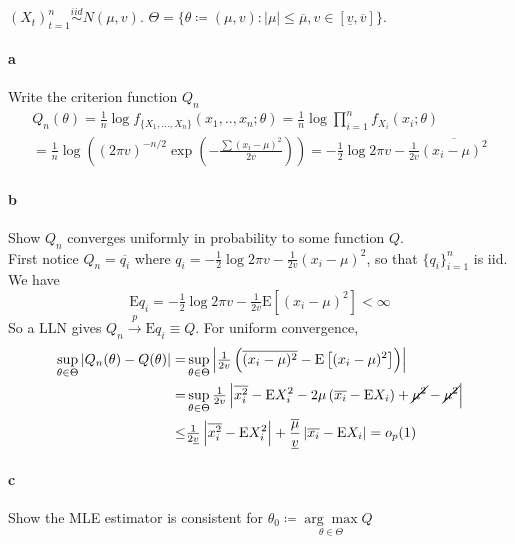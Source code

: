 \documentclass[11pt,letterpaper]{article}                  %
\begin{document}
\bigskip
\begin{problem}
$(X_t)_{t=1}^{n} \overset{iid}{\sim} N(\mu, v) $. $\Theta = \{ \theta
\coloneqq (\mu,
v): |\mu| \le \overline{\mu}, v \in [\underline{v}, \overline{v}]\}$.
\paragraph*{a} Write the criterion function $Q_n$
\begin{multline*}
  Q_n(\theta) = \tfrac{1}{n}\log f_{\{X_1,...,X_n\}}(x_1,..,x_n;\theta) =
  \tfrac{1}{n}\log \prod_{i=1}^n f_{X_i}(x_i;\theta)  \\ =
  \tfrac{1}{n} \log\left((2\pi v)^{-n/2} \exp
    \left(-\tfrac{\sum(x_i-\mu)^ 2}{2v}\right)\right) =
  -\tfrac{1}{2}\log 2\pi v 
  -\tfrac{1}{2v} \overline{(x_i - \mu)^2}
\end{multline*}

\paragraph*{b} Show $Q_n$ converges uniformly in probability to some
function $Q$. \\ 

First notice $Q_n = \overline{q_i}$ where $q_i =   -\tfrac{1}{2}\log 2\pi v -
  \tfrac{1}{2v} (x_i - \mu)^2$, so that $\{q_i\}_{i=1}^n$ is iid. We
  have 
  \begin{equation*}
    \mathrm{E}q_i =   -\tfrac{1}{2}\log 2\pi v -
  \tfrac{1}{2v} \mathrm{E}\left[(x_i - \mu)^2\right] < \infty
  \end{equation*}
So a LLN gives $Q_n \overset{p}{\rightarrow} \mathrm{E}q_i \equiv Q$.
For uniform convergence,
\begin{align*}
  \sup_{\theta \in \Theta}\left| Q_n(\theta) - Q(\theta)\right| =&
  \sup_{\theta \in \Theta} \left|\tfrac{1}{2v}\left( \overline{(x_i - \mu)^2} -
  \mathrm{E}\left[(x_i - \mu)^2\right] \right) \right| \\
=& \sup_{\theta \in \Theta} \tfrac{1}{2v} \left| \overline{x_i^2} - \mathrm{E} X_i^2 -2
     \mu \left( \overline{x_i} - \mathrm{E} X_i \right) + \cancel{\mu^2}
     - \cancel{\mu^2} \right| \\
\le& \tfrac{1}{2\underline{v}} \left| \overline{x_i^2} -
     \mathrm{E} X_i^2 \right| +
     \frac{\overline{\mu}}{\underline{v}} \left| \overline{x_i} -
     \mathrm{E} X_i \right| = o_p(1)
\end{align*}

\paragraph*{c} Show the MLE estimator is consistent for $\theta_0
\coloneqq \underset{\theta \in \Theta}{\arg\max}Q$ \\


\end{problem}
\end{document}
